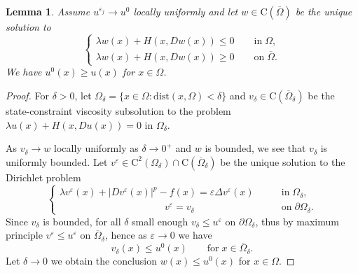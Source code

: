 \documentclass[11pt,reqno]{amsart}
\numberwithin{figure}{section}
\theoremstyle{plain}
\newtheorem{lem}[thm]{Lemma}
\theoremstyle{remark}
\numberwithin{equation}{section}
\newcommand{\rmC}{\mathrm{C}}
\begin{document}
\begin{lem} Assume $u^{\varepsilon_j}\rightarrow u^0$ locally uniformly and let $w\in \rmC(\overline{\Omega})$ be the unique solution to 
\begin{equation*}
    \begin{cases}
    \lambda w(x)  + H(x,Dw(x)) \leq 0 \qquad\text{in}\;\Omega,\\
    \lambda w(x)  + H(x,Dw(x)) \geq 0 \qquad\text{on}\;\overline{\Omega}.
    \end{cases}
\end{equation*}
We have $u^0(x)\geq u(x)$ for $x\in \Omega$.
\end{lem}
\begin{proof} For $\delta>0$, let $\Omega_\delta = \{x\in \Omega: \mathrm{dist}(x,\Omega) < \delta\}$ and $v_\delta\in\rmC(\overline{\Omega}_\delta)$ be the state-constraint viscosity subsolution to the problem $\lambda u(x) + H(x,Du(x)) = 0$ in $\Omega_\delta$.%

As $v_\delta\rightarrow w$ locally uniformly as $\delta\rightarrow 0^+$ and $w$ is bounded, we see that $v_\delta$ is uniformly bounded. Let $v^\varepsilon\in \rmC^2(\Omega_\delta)\cap \rmC(\overline{\Omega}_\delta)$ be the unique solution to the Dirichlet problem
\begin{equation}\label{eq:vv_eps}
\begin{cases}
    \lambda v^\varepsilon(x) + |Dv^\varepsilon(x)|^p - f(x) = \varepsilon \Delta v^\varepsilon(x) &\qquad\text{in}\;\Omega_\delta,\\
    \;\;\,\quad\quad\qquad\qquad\qquad\qquad v^\varepsilon = v_\delta &\qquad \text{on}\;\partial\Omega_\delta.
\end{cases}
\end{equation}
Since $v_\delta$ is bounded, for all $\delta$ small enough $v_\delta\leq u^\varepsilon$ on $\partial \Omega_\delta$, thus by maximum principle $v^\varepsilon \leq u^\varepsilon$ on $\overline{\Omega}_\delta$, hence as $\varepsilon\to 0$ we have
\begin{equation}\label{eq:les2}
    v_\delta(x) \leq u^0(x)  \qquad\text{for}\;x\in \overline{\Omega}_\delta.
\end{equation}
Let $\delta\rightarrow 0$ we obtain the conclusion $w(x)\leq u^0(x)$ for $x\in \Omega$.
\end{proof}
\end{document}
